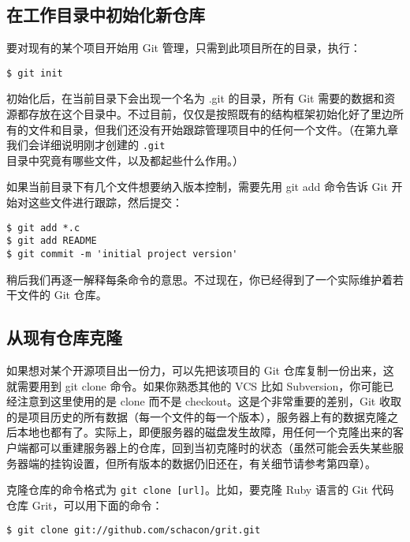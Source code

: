 \documentclass[a4paper]{book}
\begin{document}
\subsection{在工作目录中初始化新仓库}

要对现有的某个项目开始用 Git 管理，只需到此项目所在的目录，执行：

\begin{shaded}\begin{verbatim}
$ git init
\end{verbatim}\end{shaded}

初始化后，在当前目录下会出现一个名为 .git 的目录，所有 Git 需要的数据和资源都存放在这个目录中。不过目前，仅仅是按照既有的结构框架初始化好了里边所有的文件和目录，但我们还没有开始跟踪管理项目中的任何一个文件。（在第九章我们会详细说明刚才创建的 \texttt{.git} 目录中究竟有哪些文件，以及都起些什么作用。）

如果当前目录下有几个文件想要纳入版本控制，需要先用 git add 命令告诉 Git 开始对这些文件进行跟踪，然后提交：

\begin{shaded}\begin{verbatim}
$ git add *.c
$ git add README
$ git commit -m 'initial project version'
\end{verbatim}\end{shaded}

稍后我们再逐一解释每条命令的意思。不过现在，你已经得到了一个实际维护着若干文件的 Git 仓库。

\subsection{从现有仓库克隆}

如果想对某个开源项目出一份力，可以先把该项目的 Git 仓库复制一份出来，这就需要用到 git clone 命令。如果你熟悉其他的 VCS 比如 Subversion，你可能已经注意到这里使用的是 clone 而不是 checkout。这是个非常重要的差别，Git 收取的是项目历史的所有数据（每一个文件的每一个版本），服务器上有的数据克隆之后本地也都有了。实际上，即便服务器的磁盘发生故障，用任何一个克隆出来的客户端都可以重建服务器上的仓库，回到当初克隆时的状态（虽然可能会丢失某些服务器端的挂钩设置，但所有版本的数据仍旧还在，有关细节请参考第四章）。

克隆仓库的命令格式为 \texttt{git clone {[}url{]}}。比如，要克隆 Ruby 语言的 Git 代码仓库 Grit，可以用下面的命令：

\begin{shaded}\begin{verbatim}
$ git clone git://github.com/schacon/grit.git
\end{verbatim}\end{shaded}
\end{document}
